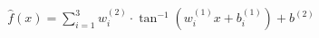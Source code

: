 \documentclass[preview]{standalone}
\begin{document}
\begin{align*}
\hat{f}(x) = \sum_{i=1}^{3} w^{(2)}_i \cdot \tan^{-1} \left( w^{(1)}_i x + b^{(1)}_i \right) + b^{(2)}
\end{align*}
\end{document}
